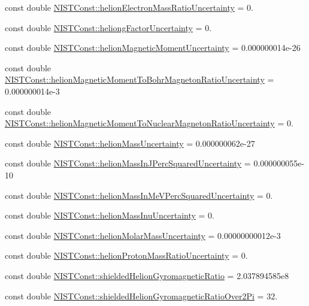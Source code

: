 \begin{DoxyCompactItemize}
\item 
const double \hyperlink{group___helion_ga2672db60c9c3de90d9815370c208d9cf}{N\+I\+S\+T\+Const\+::helion\+Electron\+Mass\+Ratio\+Uncertainty} = 0.
\item 
const double \hyperlink{group___helion_gaa285cea359208efa3360fc621e6eda8c}{N\+I\+S\+T\+Const\+::heliong\+Factor\+Uncertainty} = 0.
\item 
const double \hyperlink{group___helion_gae01ffe6f0fd72200ee03047a410823d4}{N\+I\+S\+T\+Const\+::helion\+Magnetic\+Moment\+Uncertainty} = 0.\+000000014e-\/26
\item 
const double \hyperlink{group___helion_ga3caa6325d69fddccec75d45fe0578e83}{N\+I\+S\+T\+Const\+::helion\+Magnetic\+Moment\+To\+Bohr\+Magneton\+Ratio\+Uncertainty} = 0.\+000000014e-\/3
\item 
const double \hyperlink{group___helion_gaf5d319d55655483f25e39f5036efd12a}{N\+I\+S\+T\+Const\+::helion\+Magnetic\+Moment\+To\+Nuclear\+Magneton\+Ratio\+Uncertainty} = 0.
\item 
const double \hyperlink{group___helion_gad5ae82d7c587f925f7c4fcf4ab8415cf}{N\+I\+S\+T\+Const\+::helion\+Mass\+Uncertainty} = 0.\+000000062e-\/27
\item 
const double \hyperlink{group___helion_ga2c68d6dedfd701a194ebad8211643803}{N\+I\+S\+T\+Const\+::helion\+Mass\+In\+J\+Perc\+Squared\+Uncertainty} = 0.\+000000055e-\/10
\item 
const double \hyperlink{group___helion_ga760a45e0a6294d1c3596a0b5987fd8c7}{N\+I\+S\+T\+Const\+::helion\+Mass\+In\+Me\+V\+Perc\+Squared\+Uncertainty} = 0.
\item 
const double \hyperlink{group___helion_ga447488faaf3a01ecc165dd47804b58e6}{N\+I\+S\+T\+Const\+::helion\+Mass\+Inu\+Uncertainty} = 0.
\item 
const double \hyperlink{group___helion_gae7caa0d220514ff02b27152c71bd2206}{N\+I\+S\+T\+Const\+::helion\+Molar\+Mass\+Uncertainty} = 0.\+00000000012e-\/3
\item 
const double \hyperlink{group___helion_gaae8cd14448f934c6e645d1a70686c082}{N\+I\+S\+T\+Const\+::helion\+Proton\+Mass\+Ratio\+Uncertainty} = 0.
\item 
const double \hyperlink{group___helion_gaf3b7dabd6de7a263aba710256e793c8e}{N\+I\+S\+T\+Const\+::shielded\+Helion\+Gyromagnetic\+Ratio} = 2.\+037894585e8
\item 
const double \hyperlink{group___helion_gaed43f2ab9c5e89c6dda577a3b5fc265c}{N\+I\+S\+T\+Const\+::shielded\+Helion\+Gyromagnetic\+Ratio\+Over2\+Pi} = 32.

\end{DoxyCompactItemize}
